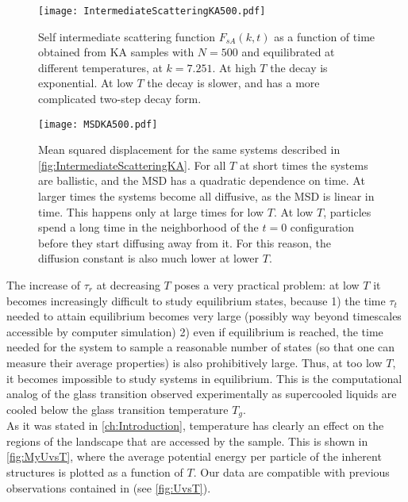 \begin{figure}[!h] 
\centering 
\texttt{[image: IntermediateScatteringKA500.pdf]} 
\caption{Self intermediate scattering function $F_{sA}(k,t)$ as a function of time obtained from KA samples with $N=500$ and equilibrated at different temperatures, at $k = 7.251$. At high $T$ the decay is exponential. At low $T$ the decay is slower, and has a more complicated two-step decay form. \label{fig:IntermediateScatteringKA}}
\end{figure}

\begin{figure}[!h] 
\centering 
\texttt{[image: MSDKA500.pdf]} 
\caption{Mean squared displacement for the same systems described in \autoref{fig:IntermediateScatteringKA}. For all $T$ at short times the systems are ballistic, and the MSD has a quadratic dependence on time. At larger times the systems become all diffusive, as the MSD is linear in time. This happens only at large times for low $T$. At low $T$, particles spend a long time in the neighborhood of the $t = 0$ configuration before they start diffusing away from it. For this reason, the diffusion constant is also much lower at lower $T$.\label{fig:MSDKA}}
\end{figure}

The increase of $\tau_{r}$ at decreasing $T$ poses a very practical problem: at low $T$ it becomes increasingly difficult to study equilibrium states, because 1) the time $\tau_{t}$ needed to attain equilibrium becomes very large (possibly way beyond timescales accessible by computer simulation) 2) even if equilibrium is reached, the time needed for the system to sample a reasonable number of states (so that one can measure their average properties) is also prohibitively large. Thus, at too low $T$, it becomes impossible to study systems in equilibrium. This is the computational analog of the glass transition observed experimentally as supercooled liquids are cooled below the glass transition temperature $T_{g}$.\\

As it was stated in \autoref{ch:Introduction}, temperature has clearly an effect on the regions of the landscape that are accessed by the sample. This is shown in \autoref{fig:MyUvsT}, where the average potential energy per particle of the inherent structures is plotted as a function of $T$. Our data are compatible with previous observations contained in \cite{lacks2004energy} (see \autoref{fig:UvsT}).

